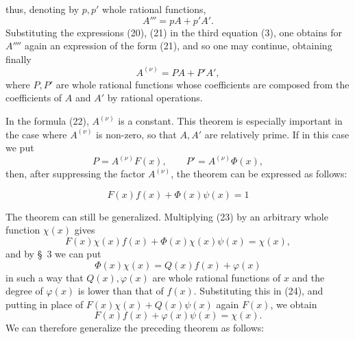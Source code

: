 
thus, denoting by $p,p'$ whole rational functions,
\begin{equation}
 A'''=pA+p'A'.
\tag{21}
\end{equation}
Substituting the expressions (20), (21) in the third equation (3), one obtains for $A''''$ again an expression of the form (21), and so one may continue, obtaining finally
\begin{equation}
 A^{(\nu)}=PA+P'A',
\tag{22}
\end{equation}
where $P,P'$ are whole rational functions whose coefficients are composed from the coefficients of $A$ and $A'$ by rational operations.

In the formula (22), $A^{(\nu)}$ is a constant. This theorem is especially important in the case where $A^{(\nu)}$ is non-zero, so that $A,A'$ are relatively prime. If in this case we put
\[
 P=A^{(\nu)}F(x),
 \qquad
 P'=A^{(\nu)}\Phi(x),
\]
then, after suppressing the factor $A^{(\nu)}$, the theorem can be expressed as follows:

\begin{equation}
 F(x)f(x)+\Phi(x)\psi(x)=1
\tag{23}
\end{equation}

The theorem can still be generalized. Multiplying (23) by an arbitrary whole function $\chi(x)$ gives
\begin{equation}
 F(x)\chi(x)f(x)+\Phi(x)\chi(x)\psi(x)=\chi(x),
\tag{24}
\end{equation}
and by \S~3 we can put
\begin{equation}
 \Phi(x)\chi(x)=Q(x)f(x)+\varphi(x)
\tag{25}
\end{equation}
in such a way that $Q(x),\varphi(x)$ are whole rational functions of $x$ and the degree of $\varphi(x)$ is lower than that of $f(x)$. Substituting this in (24), and putting in place of $F(x)\chi(x)+Q(x)\psi(x)$ again $F(x)$, we obtain
\[
 F(x)f(x)+\varphi(x)\psi(x)=\chi(x).
\]
We can therefore generalize the preceding theorem as follows:

